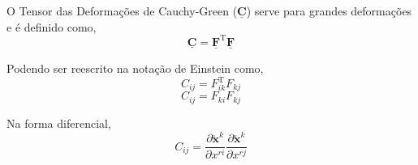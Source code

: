 O Tensor das Deformações de Cauchy-Green ($\underline{\mathbf{C}}$) serve para grandes deformações e é definido como,
\begin{equation}\label{eq-def-cauchy-green}
    \underline{\mathbf{C}}=\underline{\mathbf{F}}^{\text{T}}\underline{\mathbf{F}}
\end{equation}

Podendo ser reescrito na notação de Einstein como,
\[C_{ij}=F_{ik}^{\text{T}}F_{kj}\]
\[C_{ij}=F_{ki}F_{kj}\]

Na forma diferencial,
\[C_{ij}=\frac{\partial \utilde{\mathbf{x}}^k}{\partial x^{ri}}\frac{\partial \utilde{\mathbf{x}}^k}{\partial x^{rj}}\]